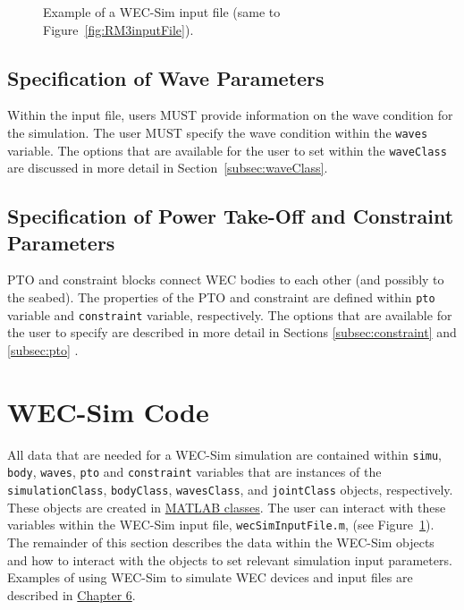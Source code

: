 \begin{figure}[H]
\centering

\caption{Example of a WEC-Sim input file (same to Figure~\ref{fig:RM3inputFile}).}
\label{fig:inputFile}
\end{figure}

\subsection{Specification of Wave Parameters}
Within the input file,  users MUST provide information on the wave condition for the simulation. The user MUST specify the wave condition within the \texttt{waves} variable. The options that are available for the user to set within the \texttt{waveClass} are discussed in more detail in Section~\ref{subsec:waveClass}.

\subsection{Specification of Power Take-Off and Constraint Parameters}
PTO and constraint blocks connect WEC bodies to each other (and possibly to the seabed). The properties of the PTO and constraint are defined within \texttt{pto} variable and \texttt{constraint} variable, respectively. The options that are available for the user to specify are described in more detail in Sections \ref{subsec:constraint} and \ref{subsec:pto} .

\section{WEC-Sim Code}\label{sec:wecSimCode}
All data that are needed for a WEC-Sim simulation are contained within \texttt{simu}, \texttt{body}, \texttt{waves}, \texttt{pto} and \texttt{constraint} variables that are instances of the \texttt{simulationClass}, \texttt{bodyClass}, \texttt{wavesClass}, and \texttt{jointClass} objects, respectively. These objects are created in  \href{http://www.mathworks.com/help/matlab/matlab_oop/classes-in-the-matlab-language.html}{MATLAB classes}. The user can interact with these variables within the WEC-Sim input file, \texttt{wecSimInputFile.m}, (see Figure~\ref{fig:inputFile}). The remainder of this section describes the data within the WEC-Sim objects and how to interact with the objects to set relevant simulation input parameters. Examples of using WEC-Sim to simulate WEC devices and input files are described in \hyperlink{chapter.6}{Chapter 6}.

